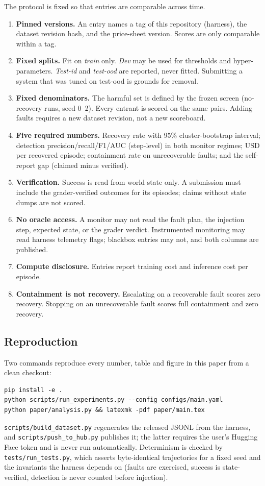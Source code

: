 The protocol is fixed so that entries are comparable across time.

\begin{enumerate}[leftmargin=1.4em]
\item \textbf{Pinned versions.} An entry names a tag of this repository (harness), the dataset
revision hash, and the price-sheet version. Scores are only comparable within a tag.
\item \textbf{Fixed splits.} Fit on \emph{train} only. \emph{Dev} may be used for thresholds and
hyper-parameters. \emph{Test-id} and \emph{test-ood} are reported, never fitted. Submitting a system
that was tuned on test-ood is grounds for removal.
\item \textbf{Fixed denominators.} The harmful set is defined by the frozen screen (no-recovery runs,
seed 0--2). Every entrant is scored on the same pairs. Adding faults requires a new dataset
revision, not a new scoreboard.
\item \textbf{Five required numbers.} Recovery rate with 95\% cluster-bootstrap interval; detection
precision/recall/F1/AUC (step-level) in both monitor regimes; USD per recovered episode; containment
rate on unrecoverable faults; and the self-report gap (claimed minus verified).
\item \textbf{Verification.} Success is read from world state only. A submission must include the
grader-verified outcomes for its episodes; claims without state dumps are not scored.
\item \textbf{No oracle access.} A monitor may not read the fault plan, the injection step, expected
state, or the grader verdict. Instrumented monitoring may read harness telemetry flags; blackbox
entries may not, and both columns are published.
\item \textbf{Compute disclosure.} Entries report training cost and inference cost per episode.
\item \textbf{Containment is not recovery.} Escalating on a recoverable fault scores zero recovery.
Stopping on an unrecoverable fault scores full containment and zero recovery.
\end{enumerate}

\subsection{Reproduction}

Two commands reproduce every number, table and figure in this paper from a clean checkout:
\begin{Verbatim}[fontsize=\footnotesize]
pip install -e .
python scripts/run_experiments.py --config configs/main.yaml
python paper/analysis.py && latexmk -pdf paper/main.tex
\end{Verbatim}
\texttt{scripts/}\allowbreak\texttt{build\_dataset.py} regenerates the released JSONL from the
harness, and \texttt{scripts/}\allowbreak\texttt{push\_to\_hub.py} publishes it; the latter
requires the user's Hugging Face token and is never run automatically. Determinism is checked by \texttt{tests/run\_tests.py}, which asserts
byte-identical trajectories for a fixed seed and the invariants the harness depends on (faults are
exercised, success is state-verified, detection is never counted before injection).

